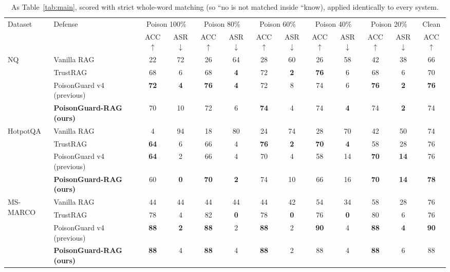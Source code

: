\begin{table}[t]\centering\small
\caption{As Table~\ref{tab:main}, scored with strict whole-word matching (so ``no is not matched inside ``know), applied identically to every system.}\label{tab:strict}
\begin{tabular}{llccccccccccc}\toprule
Dataset & Defense & \multicolumn{2}{c}{Poison 100\%} & \multicolumn{2}{c}{Poison 80\%} & \multicolumn{2}{c}{Poison 60\%} & \multicolumn{2}{c}{Poison 40\%} & \multicolumn{2}{c}{Poison 20\%} & Clean \\
 & & ACC$\uparrow$ & ASR$\downarrow$ & ACC$\uparrow$ & ASR$\downarrow$ & ACC$\uparrow$ & ASR$\downarrow$ & ACC$\uparrow$ & ASR$\downarrow$ & ACC$\uparrow$ & ASR$\downarrow$ & ACC$\uparrow$ \\\midrule
\multirow{4}{*}{NQ} & Vanilla RAG & 22 & 72 & 26 & 64 & 28 & 60 & 26 & 58 & 42 & 38 & 66 \\
 & TrustRAG & 68 & 6 & 68 & \textbf{4} & 72 & \textbf{2} & \textbf{76} & 6 & 68 & 6 & 70 \\
 & PoisonGuard v4 (previous) & \textbf{72} & \textbf{4} & \textbf{76} & \textbf{4} & 72 & 8 & 74 & 6 & \textbf{76} & \textbf{2} & \textbf{76} \\
 & \textbf{PoisonGuard-RAG (ours)} & 70 & 10 & 72 & 6 & \textbf{74} & 4 & 74 & \textbf{4} & 74 & \textbf{2} & 74 \\
\midrule
\multirow{4}{*}{HotpotQA} & Vanilla RAG & 4 & 94 & 18 & 80 & 24 & 74 & 28 & 70 & 42 & 50 & 74 \\
 & TrustRAG & \textbf{64} & 6 & 66 & 4 & \textbf{76} & \textbf{2} & \textbf{70} & \textbf{4} & 58 & 28 & 76 \\
 & PoisonGuard v4 (previous) & \textbf{64} & 2 & 66 & 4 & 70 & 4 & 58 & 14 & \textbf{70} & \textbf{14} & 76 \\
 & \textbf{PoisonGuard-RAG (ours)} & 60 & \textbf{0} & \textbf{70} & \textbf{2} & 74 & 10 & 66 & 16 & \textbf{70} & \textbf{14} & \textbf{78} \\
\midrule
\multirow{4}{*}{MS-MARCO} & Vanilla RAG & 44 & 44 & 44 & 44 & 44 & 42 & 54 & 34 & 58 & 28 & 76 \\
 & TrustRAG & 78 & 4 & 82 & \textbf{0} & 78 & \textbf{0} & 76 & \textbf{0} & 80 & 6 & 76 \\
 & PoisonGuard v4 (previous) & \textbf{88} & \textbf{2} & \textbf{88} & 2 & \textbf{88} & 2 & \textbf{90} & 4 & \textbf{88} & \textbf{4} & \textbf{90} \\
 & \textbf{PoisonGuard-RAG (ours)} & \textbf{88} & 4 & \textbf{88} & 4 & \textbf{88} & 2 & 88 & 4 & \textbf{88} & 6 & 88 \\
\bottomrule
\end{tabular}\end{table}

